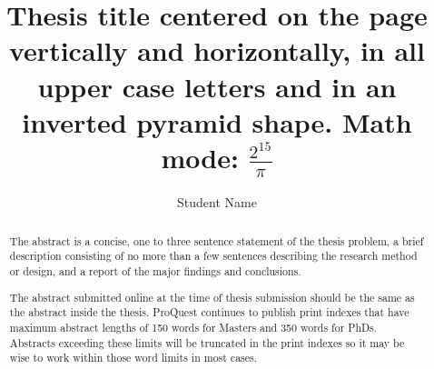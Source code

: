 \documentclass{mines-thesis}
\begin{document}
	\autotitle %
	\title{Thesis title centered on the page vertically and horizontally, in all upper case letters
		and in an inverted pyramid shape. Math mode: $\frac{2^{15}}{\pi}$
	}
	
	\author{Student Name}  %
	
	
	
	\begin{abstract}
		The abstract is a concise, one to three sentence statement of the thesis problem, a brief description consisting of no more than a few sentences describing the research method or design, and a report of the major findings and conclusions.
		
		The abstract submitted online at the time of thesis submission should be the same as the abstract inside the thesis. ProQuest continues to publish print indexes that have maximum abstract lengths of 150 words for Masters and 350 words for PhDs. Abstracts exceeding these limits will be truncated in the print indexes so it may be wise to work within those word limits in most cases.
	\end{abstract}
	

	\makefrontmatter
\end{document}
